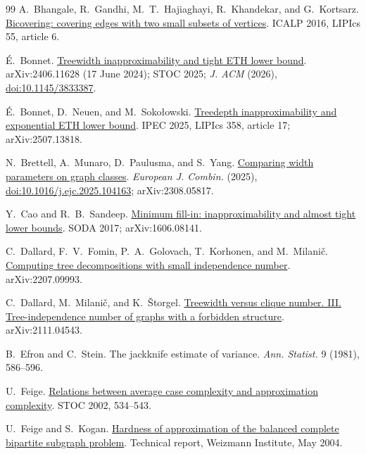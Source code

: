 \documentclass[11pt,letterpaper]{article}
\theoremstyle{definition}
\theoremstyle{remark}
\begin{document}
\begin{thebibliography}{99}
A.~Bhangale, R.~Gandhi, M.~T.~Hajiaghayi, R.~Khandekar, and G.~Kortsarz.
\href{https://drops.dagstuhl.de/entities/document/10.4230/LIPIcs.ICALP.2016.6}{Bicovering: covering edges with two small subsets of vertices}.
ICALP 2016, LIPIcs 55, article 6.

\'E.~Bonnet.
\href{https://arxiv.org/abs/2406.11628}{Treewidth inapproximability and tight ETH lower bound}.
arXiv:2406.11628 (17 June 2024); STOC 2025;
\emph{J. ACM} (2026), \href{https://doi.org/10.1145/3833387}{doi:10.1145/3833387}.

\'E.~Bonnet, D.~Neuen, and M.~Soko\l{}owski.
\href{https://drops.dagstuhl.de/entities/document/10.4230/LIPIcs.IPEC.2025.17}{Treedepth inapproximability and exponential ETH lower bound}.
IPEC 2025, LIPIcs 358, article 17; arXiv:2507.13818.

N.~Brettell, A.~Munaro, D.~Paulusma, and S.~Yang.
\href{https://arxiv.org/abs/2308.05817}{Comparing width parameters on graph classes}.
\emph{European J. Combin.} (2025), \href{https://doi.org/10.1016/j.ejc.2025.104163}{doi:10.1016/j.ejc.2025.104163}; arXiv:2308.05817.

Y.~Cao and R.~B.~Sandeep.
\href{https://arxiv.org/abs/1606.08141}{Minimum fill-in: inapproximability and almost tight lower bounds}.
SODA 2017; arXiv:1606.08141.

C.~Dallard, F.~V.~Fomin, P.~A.~Golovach, T.~Korhonen, and M.~Milani\v{c}.
\href{https://arxiv.org/abs/2207.09993}{Computing tree decompositions with small independence number}.
arXiv:2207.09993.

C.~Dallard, M.~Milani\v{c}, and K.~\v{S}torgel.
\href{https://arxiv.org/abs/2111.04543}{Treewidth versus clique number. III. Tree-independence number of graphs with a forbidden structure}.
arXiv:2111.04543.

B.~Efron and C.~Stein.
The jackknife estimate of variance.
\emph{Ann. Statist.} 9 (1981), 586--596.

U.~Feige.
\href{https://doi.org/10.1145/509907.509985}{Relations between average case complexity and approximation complexity}.
STOC 2002, 534--543.

U.~Feige and S.~Kogan.
\href{https://www.wisdom.weizmann.ac.il/~feige/TechnicalReports/FeigeKogan.pdf}{Hardness of approximation of the balanced complete bipartite subgraph problem}.
Technical report, Weizmann Institute, May 2004.


\end{thebibliography}
\end{document}
